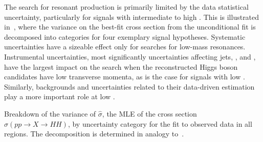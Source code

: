 The search for resonant \HH production is primarily limited by the data
statistical uncertainty, particularly for signals with intermediate to high
\mX. This is illustrated in~, where the variance on the
best-fit cross section from the unconditional fit
is decomposed into categories for four exemplary signal hypotheses. Systematic
uncertainties have a sizeable effect
only for searches for low-mass resonances. Instrumental uncertainties, most
significantly uncertainties affecting jets, \pTmissAbs, and \tauhadvis, have the
largest impact on the search when the reconstructed Higgs boson candidates have
low transverse momenta, as is the case for signals with low \mX. Similarly,
\faketauhadvisC backgrounds and uncertainties related to their data-driven
estimation
play a more important role at low \mX.

\begin{table}[htbp]
  \centering

  \caption[Breakdown of the variance of $\hat{\sigma}$ by uncertainty category
  for the search for resonant \HH production.]{Breakdown of the variance of
    $\hat{\sigma}$, the MLE of the cross section $\sigma(pp \to X\to HH)$, by
    uncertainty category for the fit to observed data in all regions. The
    decomposition is determined in analogy to~.}%
  \label{tab:breakdown_res}


  

\end{table}

